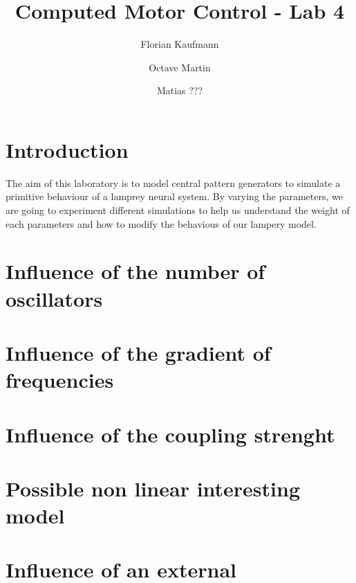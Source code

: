 \documentclass[a4paper]{scrartcl}
\title{Computed Motor Control - Lab 4}
\author{Florian Kaufmann \and Octave Martin \and Matias ???}
\begin{document}
\maketitle

\section{Introduction}
The aim of this laboratory is to model central pattern generators to simulate a primitive behaviour of a lamprey neural system. By varying the parameters, we are going to experiment different simulations to help us understand the weight of each parameters and how to modify the behavious of our lampery model.

\section{Influence of the number of oscillators}

\section{Influence of the gradient of frequencies}

\section{Influence of the coupling strenght}

\section{Possible non linear interesting model}

\section{Influence of an external }
\end{document}
